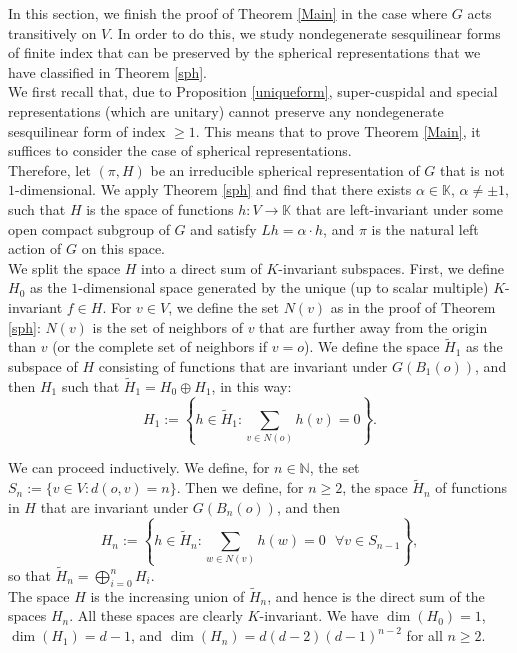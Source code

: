 \documentclass{article}
\theoremstyle{definition}
\theoremstyle{remark}
\theoremstyle{plain}
\begin{document}
In this section, we finish the proof of Theorem \ref{Main} in the case where $G$ acts transitively on $V$. In order to do this, we study nondegenerate sesquilinear forms of finite index that can be preserved by the spherical representations that we have classified in Theorem \ref{sph}. \\

We first recall that, due to Proposition \ref{uniqueform}, super-cuspidal and special representations (which are unitary) cannot preserve any nondegenerate sesquilinear form of index $\geq 1$. This means that to prove Theorem \ref{Main}, it suffices to consider the case of spherical representations. \\

Therefore, let $(\pi,H)$ be an irreducible spherical representation of $G$ that is not $1$-dimensional. We apply Theorem \ref{sph} and find that there exists $\alpha\in\mathbb{K}$, $\alpha\neq\pm 1$, such that $H$ is the space of functions $h: V\rightarrow\mathbb{K}$ that are left-invariant under some open compact subgroup of $G$ and satisfy $Lh=\alpha\cdot h$, and $\pi$ is the natural left action of $G$ on this space. \\

We split the space $H$ into a direct sum of $K$-invariant subspaces. First, we define $H_0$ as the $1$-dimensional space generated by the unique (up to scalar multiple) $K$-invariant $f\in H$. For $v\in V$, we define the set $N(v)$ as in the proof of Theorem \ref{sph}: $N(v)$ is the set of neighbors of $v$ that are further away from the origin than $v$ (or the complete set of neighbors if $v=o$). We define the space $\widetilde{H}_1$ as the subspace of $H$ consisting of functions that are invariant under $G(B_1(o))$, and then $H_1$ such that $\widetilde{H}_1=H_0\oplus H_1$, in this way: $$H_1:=\left\{h\in\widetilde{H}_1: \sum_{v\in N(o)}{h(v)}=0\right\}.$$

We can proceed inductively. We define, for $n\in\mathbb{N}$, the set $S_n:=\{v\in V: d(o,v)=n\}$. Then we define, for $n\geq 2$, the space $\widetilde{H}_n$ of functions in $H$ that are invariant under $G(B_n(o))$, and then $$H_n:=\left\{h\in\widetilde{H}_n: \sum_{w\in N(v)}{h(w)}=0\ \ \ \forall v\in S_{n-1}\right\},$$ so that $\widetilde{H}_n=\bigoplus_{i=0}^{n}{H_i}$. \\

The space $H$ is the increasing union of $\widetilde{H}_n$, and hence is the direct sum of the spaces $H_n$. All these spaces are clearly $K$-invariant. We have $\dim(H_0)=1$, $\dim(H_1)=d-1$, and $\dim(H_n)=d(d-2)(d-1)^{n-2}$ for all $n\geq 2$. \\
\end{document}
